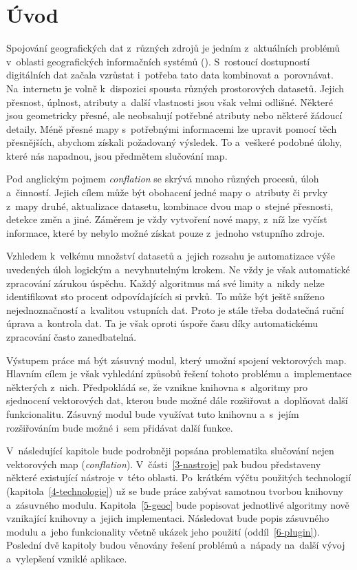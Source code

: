 \chapter{Úvod}
\label{1-uvod}

Spojování geografických dat z~různých zdrojů je jedním z~aktuálních
problémů v~oblasti geografických informačních systémů (). 
S~rostoucí dostupností di\-gitálních dat začala vzrůstat i~potřeba 
tato data kombinovat a~porovnávat. Na~internetu je volně k~dispozici 
spousta různých prostorových datasetů. Jejich přes\-nost, úplnost, 
atributy a~další vlastnosti jsou však velmi odlišné. Některé jsou 
geo\-metricky přesné, ale neobsahují potřebné atributy nebo některé 
žádoucí detaily. Méně přesné mapy s~potřebnými informacemi lze upravit 
pomocí těch přesnějších, abychom získali požadovaný výsledek. To 
a~veškeré podobné úlohy, které nás napadnou, jsou předmětem slučování 
map.

Pod anglickým pojmem \textit{conflation} se skrývá mnoho různých
procesů, úloh a~činností. Jejich cílem může být obohacení jedné mapy 
o~atributy či prvky z~mapy druhé, aktualizace datasetu, kombinace 
dvou map o~stejné přesnosti, detekce změn a jiné. Záměrem je vždy 
vytvoření nové mapy, z~níž lze vyčíst informace, které by nebylo možné
získat pouze z~jednoho vstupního zdroje.

Vzhledem k~velkému množství datasetů a~jejich rozsahu je automatizace
výše uvedených úloh logickým a~nevyhnutelným krokem. Ne vždy je však
automatické zpracování zárukou úspěchu. Každý algoritmus má své limity
a~nikdy nelze identifi\-kovat sto procent odpovídajících si prvků. To může
být ještě sníženo nejednoznač\-ností a~kvalitou vstupních dat. Proto je 
stále třeba dodatečná ruční úprava a~kontrola dat. Ta je však oproti 
úspoře času díky automatickému zpracování často za\-ne\-dbatelná.

Výstupem práce má být zásuvný modul, který umožní spojení vektorových 
map. Hlavním cílem je však vyhledání způsobů řešení tohoto problému 
a~implementace některých z~nich. Předpokládá se, že vznikne knihovna 
s~algoritmy pro sjednocení vektorových dat, kterou bude možné dále 
rozšiřovat a~doplňovat další funkcionalitu. Zásuvný modul bude využívat 
tuto knihovnu a~s~jejím rozšiřováním bude možné i~sem přidávat další 
funkce.   

V~následující kapitole bude podrobněji popsána problematika slučování 
nejen vektorových map (\textit{conflation}). V~části~\ref{3-nastroje} 
pak budou představeny některé existující nástroje v~této oblasti. 
Po~krátkém výčtu použitých technologií (kapitola~\ref{4-technologie})
už se bude práce zabývat samotnou tvorbou knihovny a~zásuvného modulu. 
Kapitola~\ref{5-geoc} bude popisovat jednotlivé algoritmy nově vznikající
knihovny a~jejich implementaci. Následovat bude popis zásuvného modulu 
a~jeho funkcionality včetně ukázek jeho použití (oddíl~\ref{6-plugin}). 
Poslední dvě kapitoly budou věnovány řešení problémů a~nápady na~další 
vývoj a~vylepšení vzniklé aplikace.  


